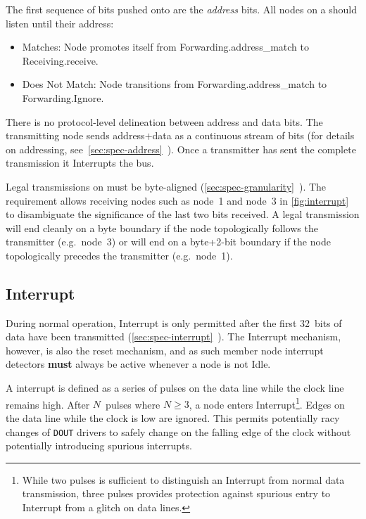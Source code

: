 The first sequence of bits pushed onto \bus are the {\em address} bits. All
nodes on a \bus should listen until their address:
\begin{itemize}
  \item Matches: Node promotes itself from Forwarding.{\sc address\_match} to
    Receiving.{\sc receive}.
  \item Does Not Match: Node transitions from Forwarding.{\sc address\_match}
    to Forwarding.{\sc Ignore}.
\end{itemize}

There is no protocol-level delineation between address and data bits. The
transmitting node sends address$+$data as a continuous stream of bits (for
details on \bus addressing,
see~\ref{sec:spec-address}~). Once a transmitter has
sent the complete transmission it Interrupts the bus.

Legal transmissions on \bus must be byte-aligned
(\ref{sec:spec-granularity}~). The requirement
allows receiving nodes such as node~1 and node~3 in \cref{fig:interrupt}
to disambiguate the significance of the last two bits received. A legal
transmission will end cleanly on a byte boundary if the node topologically
follows the transmitter (e.g.~node~3) or will end on a byte+2-bit boundary if
the node topologically precedes the transmitter (e.g.~node~1).

\subsection{Interrupt}
\label{sec:protocol-interrupt}
During normal operation, Interrupt is only permitted after the first 32~bits
of data have been transmitted
(\ref{sec:spec-interrupt}~). The Interrupt
mechanism, however, is also the \bus reset mechanism, and as such member node
interrupt detectors {\bf must} always be active whenever a node is not Idle.

A \bus interrupt is defined as a series of pulses on the data line while the
clock line remains high. After $N$~pulses where $N \ge 3$, a node enters
Interrupt\footnote{
  While two pulses is sufficient to distinguish an Interrupt from normal data
  transmission, three pulses provides protection against spurious entry to
  Interrupt from a glitch on data lines.}.
Edges on the data line while the clock is low are ignored. This permits
potentially racy changes of {\tt DOUT} drivers to safely change on the falling
edge of the clock without potentially introducing spurious interrupts.

